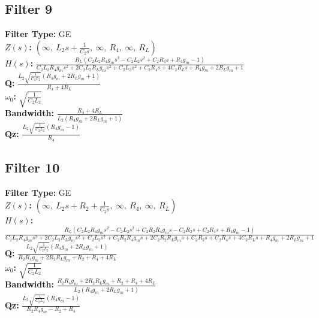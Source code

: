 \documentclass{article}
\begin{document}
\subsection*{Filter 9}
\textbf{Filter Type:} GE \\ 
\textbf{$Z(s)$:} $\left( \infty, \  L_{2} s + \frac{1}{C_{2} s}, \  \infty, \  R_{4}, \  \infty, \  R_{L}\right)$ \\ 
\textbf{$H(s)$:} $\frac{R_{L} \left(C_{2} L_{2} R_{4} g_{m} s^{2} - C_{2} L_{2} s^{2} + C_{2} R_{4} s + R_{4} g_{m} - 1\right)}{C_{2} L_{2} R_{4} g_{m} s^{2} + 2 C_{2} L_{2} R_{L} g_{m} s^{2} + C_{2} L_{2} s^{2} + C_{2} R_{4} s + 4 C_{2} R_{L} s + R_{4} g_{m} + 2 R_{L} g_{m} + 1}$ \\ 
\textbf{Q:} $\frac{L_{2} \sqrt{\frac{1}{C_{2} L_{2}}} \left(R_{4} g_{m} + 2 R_{L} g_{m} + 1\right)}{R_{4} + 4 R_{L}}$ \\ 
\textbf{$\omega_0$:} $\sqrt{\frac{1}{C_{2} L_{2}}}$ \\ 
\textbf{Bandwidth:} $\frac{R_{4} + 4 R_{L}}{L_{2} \left(R_{4} g_{m} + 2 R_{L} g_{m} + 1\right)}$ \\ 
\textbf{Qz:} $\frac{L_{2} \sqrt{\frac{1}{C_{2} L_{2}}} \left(R_{4} g_{m} - 1\right)}{R_{4}}$ \\ 
\subsection*{Filter 10}
\textbf{Filter Type:} GE \\ 
\textbf{$Z(s)$:} $\left( \infty, \  L_{2} s + R_{2} + \frac{1}{C_{2} s}, \  \infty, \  R_{4}, \  \infty, \  R_{L}\right)$ \\ 
\textbf{$H(s)$:} $\frac{R_{L} \left(C_{2} L_{2} R_{4} g_{m} s^{2} - C_{2} L_{2} s^{2} + C_{2} R_{2} R_{4} g_{m} s - C_{2} R_{2} s + C_{2} R_{4} s + R_{4} g_{m} - 1\right)}{C_{2} L_{2} R_{4} g_{m} s^{2} + 2 C_{2} L_{2} R_{L} g_{m} s^{2} + C_{2} L_{2} s^{2} + C_{2} R_{2} R_{4} g_{m} s + 2 C_{2} R_{2} R_{L} g_{m} s + C_{2} R_{2} s + C_{2} R_{4} s + 4 C_{2} R_{L} s + R_{4} g_{m} + 2 R_{L} g_{m} + 1}$ \\ 
\textbf{Q:} $\frac{L_{2} \sqrt{\frac{1}{C_{2} L_{2}}} \left(R_{4} g_{m} + 2 R_{L} g_{m} + 1\right)}{R_{2} R_{4} g_{m} + 2 R_{2} R_{L} g_{m} + R_{2} + R_{4} + 4 R_{L}}$ \\ 
\textbf{$\omega_0$:} $\sqrt{\frac{1}{C_{2} L_{2}}}$ \\ 
\textbf{Bandwidth:} $\frac{R_{2} R_{4} g_{m} + 2 R_{2} R_{L} g_{m} + R_{2} + R_{4} + 4 R_{L}}{L_{2} \left(R_{4} g_{m} + 2 R_{L} g_{m} + 1\right)}$ \\ 
\textbf{Qz:} $\frac{L_{2} \sqrt{\frac{1}{C_{2} L_{2}}} \left(R_{4} g_{m} - 1\right)}{R_{2} R_{4} g_{m} - R_{2} + R_{4}}$ \\ 
\end{document}
